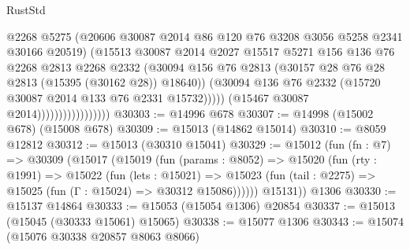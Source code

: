 \begin{lexlean}{RustStd}
\begin{coremodule}
                                        @2268
                                        @5275
                                        (@20606
                                          @30087
                                          @2014
                                          @86
                                          @120
                                          @76
                                          @3208
                                          @3056
                                          @5258
                                          @2341
                                          @30166
                                          @20519)
                                        (@15513
                                          @30087
                                          @2014
                                          @2027
                                          @15517
                                          @5271
                                          @156
                                          @136
                                          @76
                                          @2268
                                          @2813
                                          @2268
                                          @2332
                                          (@30094
                                            @156
                                            @76
                                            @2813
                                            (@30157 @28 @76 @28 @2813 (@15395 (@30162 @28)) @18640))
                                          (@30094
                                            @136
                                            @76
                                            @2332
                                            (@15720 @30087 @2014 @133 @76 @2331 @15732)))))
                                    (@15467 @30087 @2014)))))))))))))))))
@30303 := @14996 @678
@30307 := @14998 (@15002 @678) (@15008 @678)
@30309 := @15013 (@14862 @15014)
@30310 := @8059 @12812
@30312 := @15013 (@30310 @15041)
@30329 := @15012
    (fun (fn : @7) =>
    @30309
      (@15017
        (@15019
          (fun (params : @8052) =>
          @15020
            (fun (rty : @1991) =>
            @15022
              (fun (lets : @15021) =>
              @15023 (fun (tail : @2275) => @15025 (fun (Γ : @15024) => @30312 @15086))))))
        @15131))
    @1306
@30330 := @15137 @14864
@30333 := @15053 (@15054 @1306) @20854
@30337 := @15013 (@15045 (@30333 @15061) @15065)
@30338 := @15077 @1306
@30343 := @15074 (@15076 @30338 @20857 @8063 @8066)

\end{coremodule}
\end{lexlean}
